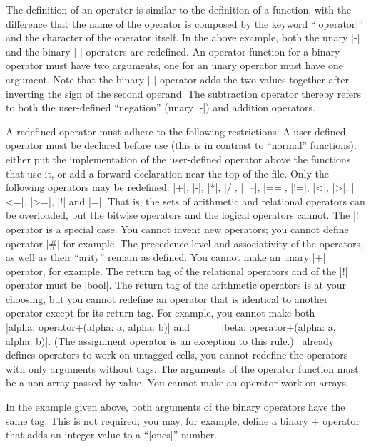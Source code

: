 The definition of an operator is similar to the definition of a function,
with the difference that the name of the operator is composed by the
keyword ``|operator|'' and the character of the operator itself.
In the above example, both the unary |-| and the binary |-| operators are
redefined. An operator function for a binary operator must have two arguments,
one for an unary operator must have one argument. Note that the binary |-|
operator adds the two values together after inverting the sign of the second
operand. The subtraction operator thereby refers to both the user-defined
``negation'' (unary |-|) and addition operators.

A redefined operator must adhere to the following restrictions:
\beginlist{1em} \compactlist
\list{\lbullet}
  \noindent{}%
  A user-defined operator must be declared before use (this is in contrast to
  ``normal'' functions): either put the implementation of the user-defined operator
  above the functions that use it, or add a forward declaration near the top of
  the file.
\list{\lbullet}
  Only the following operators may be redefined: |+|, |-|, |*|, |/|, |%
  |--|, |==|, |!=|, |<|, |>|, |<=|, |>=|, |!| and |=|. That is, the sets of
  arithmetic and relational operators can be overloaded, but the bitwise
  operators and the logical operators cannot. The |!| operator is a special case.
\list{\lbullet}
  You cannot invent new operators; you cannot define operator |#| for example.
\list{\lbullet}
  The precedence level and associativity of the operators, as well as their
  ``arity'' remain as defined. You cannot make an unary |+| operator, for
  example.
\list{\lbullet}
  The return tag of the relational operators and of the |!| operator must be
  |bool|.
\list{\lbullet}
  The return tag of the arithmetic operators is at your choosing, but you
  cannot redefine an operator that is identical to another operator except
  for its return tag. For example, you cannot make both \lbreak
  ~~~~~ |alpha: operator+(alpha: a, alpha: b)| \lbreak
  and \lbreak
  ~~~~~ |beta: operator+(alpha: a, alpha: b)|. \lbreak
  (The assignment operator is an exception to this rule.)
\list{\lbullet}
  \Small\ already defines operators to work on untagged cells, you cannot
  redefine the operators with only arguments without tags.
\list{\lbullet}
  The arguments of the operator function must be a non-array passed by value.
  You cannot make an operator work on arrays.
\endlist

In the example given above, both arguments of the binary operators have the
same tag. This is not required; you may, for example, define a binary $+$
operator that adds an integer value to a ``|ones|'' number.

